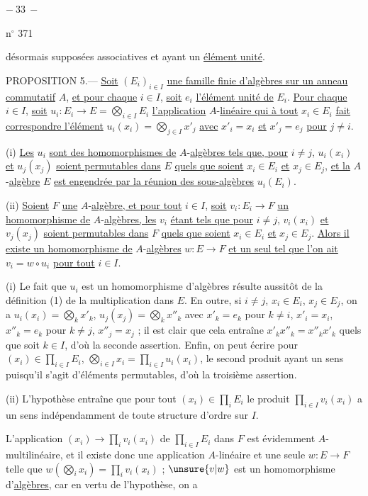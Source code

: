 \begin{center}$-\ 33\ -$\end{center}
\hfill n$^\circ$ 371

désormais supposées associatives et ayant un \uline{élément unité}.

PROPOSITION 5.--- \uline{Soit} $(E_i)_{i\in I}$ \uline{une famille finie d'algèbres sur un anneau commutatif} $A$, \uline{et pour chaque} $i\in I$, \uline{soit} $e_i$ \uline{l'élément unité de} $E_i$. \uline{Pour chaque} $i\in I$, \uline{soit} $u_i:E_i\to E=\bigotimes_{i\in I}E_i$ \uline{l'application} $A$-\uline{linéaire qui à tout} $x_i\in E_i$ \uline{fait correspondre l'élément} $u_i(x_i)=\bigotimes_{j\in I}x'_j$ \uline{avec} $x'_i=x_i$ \uline{et} $x'_j=e_j$ \uline{pour} $j\ne i$.

(i) \uline{Les} $u_i$ \uline{sont des homomorphismes de} $A$-\uline{algèbres tels que, pour} $i\ne j$, $u_i(x_i)$ \uline{et} $u_j(x_j)$ \uline{soient permutables dans} $E$ \uline{quels que soient} $x_i\in E_i$ \uline{et} $x_j\in E_j$, \uline{et la} $A$-\uline{algèbre} $E$ \uline{est engendrée par la réunion des sous-algèbres} $u_i(E_i)$.

(ii) \uline{Soient} $F$ \uline{une} $A$-\uline{algèbre, et pour tout} $i\in I$, \uline{soit} $v_i:E_i\to F$ \uline{un homomorphisme de} $A$-\uline{algèbres, les} $v_i$ \uline{étant tels que pour} $i\ne j$, $v_i(x_i)$ \uline{et} $v_j(x_j)$ \uline{soient permutables dans} $F$ \uline{quels que soient} $x_i\in E_i$ \uline{et} $x_j\in E_j$. \uline{Alors il existe un homomorphisme de} $A$-\uline{algèbres} $w:E\to F$ \uline{et un seul tel que l'on ait} $v_i=w\circ u_i$ \uline{pour tout} $i\in I$.

(i) Le fait que $u_i$ est un homomorphisme d'algèbres résulte aussitôt de la définition (1) de la multiplication dans $E$. En outre, si $i\ne j$, $x_i\in E_i$, $x_j\in E_j$, on a $u_i(x_i)=\bigotimes_k x'_k$, $u_j(x_j)=\bigotimes_k x''_k$ avec $x'_k=e_k$ pour $k\ne i$, $x'_i=x_i$, $x''_k=e_k$ pour $k\ne j$, $x''_j=x_j$ ; il est clair que cela entraîne $x'_kx''_k=x''_kx'_k$ quels que soit $k\in I$, d'où la seconde assertion. Enfin, on peut écrire pour $(x_i)\in\prod_{i\in I}E_i$, $\bigotimes_{i\in I}x_i=\prod_{i\in I}u_i(x_i)$, le second produit ayant un sens puisqu'il s'agit d'éléments permutables, d'où la troisième assertion.

(ii) L'hypothèse entraîne que pour tout $(x_i)\in\prod_i E_i$ le produit $\prod_{i\in I}v_i(x_i)$ a un sens indépendamment de toute structure d'ordre sur $I$.

L'application $(x_i)\to\prod_i v_i(x_i)$ de $\prod_{i\in I}E_i$ dans $F$ est évidemment $A$-multilinéaire, et il existe donc une application $A$-linéaire et une seule $w:E\to F$ telle que $w(\bigotimes_i x_i)=\prod_i v_i(x_i)$ ; $\unsure{v|w}$ est un homomorphisme d'\uline{algèbres}, car en vertu de l'hypothèse, on a
